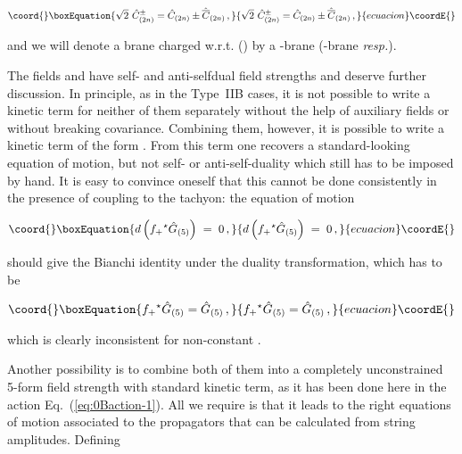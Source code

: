 \documentclass[12pt,a4paper]{article}
\begin{document}
\begin{equation}\coord{}\boxEquation{
\sqrt{2}\ \hat{C}_{(2n)}^{\pm} = \hat{C}_{(2n)}\pm 
                                 \hat{\overline{C}}_{(2n)}\, ,
}{
\sqrt{2}\ \hat{C}_{(2n)}^{\pm} = \hat{C}_{(2n)}\pm 
                                 \hat{\overline{C}}_{(2n)}\, ,
}{ecuacion}\coordE{}\end{equation}

\noindent and we will denote a brane charged w.r.t. \coordHE{}
(\coordHE{}) by a \coordHE{}-brane (\coordHE{}-brane {\em resp.}). 

The fields \coordHE{} and \coordHE{} have self- 
and anti-selfdual field strengths and deserve further discussion. In
principle, as in the Type~IIB\myHighlight{$_{\pm}$}\coordHE{} cases, it is not possible to
write a kinetic term for neither of them separately without the help
of auxiliary fields or without breaking covariance. Combining
them, however, it is possible to write a kinetic term of the form
\coordHE{}. From this term one recovers a
standard-looking equation of motion, but not self- or
anti-self-duality which still has to be imposed by hand. It is easy to
convince oneself that this cannot be done consistently in the presence
of coupling to the tachyon: the equation of motion

\begin{equation}\coord{}\boxEquation{
d\left( f_{+} {}^{\star}\hat{G}_{(5)}\right) \;=\; 0\, ,  
}{
d\left( f_{+} {}^{\star}\hat{G}_{(5)}\right) \;=\; 0\, ,  
}{ecuacion}\coordE{}\end{equation}

\noindent should give the Bianchi identity under the duality 
transformation, which has to be

\begin{equation}\coord{}\boxEquation{
f_{+} {}^{\star}\hat{G}_{(5)} = \hat{G}_{(5)}\, ,
}{
f_{+} {}^{\star}\hat{G}_{(5)} = \hat{G}_{(5)}\, ,
}{ecuacion}\coordE{}\end{equation}

\noindent which is clearly inconsistent for non-constant \coordHE{}.

Another possibility is to combine both of them into a completely
unconstrained 5-form field strength \coordHE{} with standard
kinetic term, as it has been done here in the action
Eq.~(\ref{eq:0Baction-1}). All we require is that it leads to the
right equations of motion associated to the propagators that can be
calculated from string amplitudes. Defining
\end{document}
